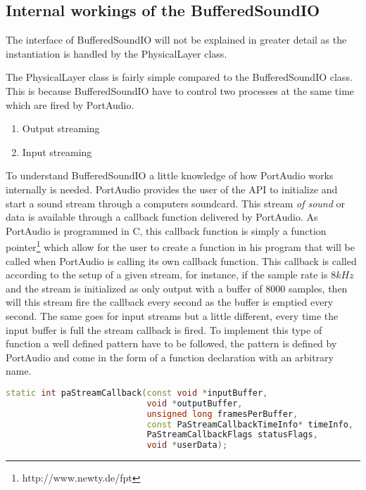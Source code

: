 	\subsection{Internal workings of the BufferedSoundIO}
	The interface of BufferedSoundIO will not be explained in greater detail as the instantiation is handled by the PhysicalLayer class.
	
	The PhysicalLayer class is fairly simple compared to the BufferedSoundIO class. This is because BufferedSoundIO have to control two processes
	at the same time which are fired by PortAudio.
	
	\begin {enumerate}
	\item Output streaming
	\item Input streaming
	\end{enumerate}
	
	To understand BufferedSoundIO a little knowledge of how PortAudio works internally is needed. PortAudio provides the user of the API to initialize
	and start a sound stream through a computers soundcard. This stream \textit{of sound} or data is available through a callback function delivered
	by PortAudio. As PortAudio is programmed in C, this callback function is simply a function pointer\footnote{http://www.newty.de/fpt}
	which allow for the user to create a function in his program that will be called when PortAudio is calling its own callback function.
	This callback is called according to the setup of a given stream, for instance, if the sample rate is $8kHz$ and the stream is initialized as 
	only output with a buffer of 8000 samples, then will this stream fire the callback every second as the buffer is emptied every second.
	The same goes for input streams but a little different, every time the input buffer is full the stream callback is fired. To implement
	this type of function a well defined pattern have to be followed, the pattern is defined by PortAudio and come in the form of a
	function declaration with an arbitrary name. 
	
	\begin{lstlisting}[float=htb,language={C++},caption={PortAudios callback function declaration. This declaration is used for both input
	streams, output streams, and the two in combination.}]
static int paStreamCallback(const void *inputBuffer,
							void *outputBuffer,
							unsigned long framesPerBuffer,
							const PaStreamCallbackTimeInfo* timeInfo,
							PaStreamCallbackFlags statusFlags,
							void *userData);
	\end{lstlisting}\label{lst:pa_callback}
	
